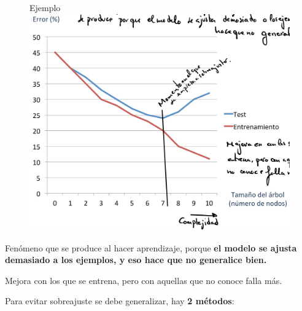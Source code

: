 \documentclass[12pt, twoside, openright]{report} %
\begin{document}
\begin{figure}[H]
	Ejemplo
	{\includegraphics[scale=.2]{image-20210305195646416.png}}
\end{figure}

Fenómeno que se produce al hacer aprendizaje, porque \textbf{el modelo
se ajusta demasiado a los ejemplos, y eso hace que no generalice bien.}

Mejora con los que se entrena, pero con aquellas que no conoce falla
más.

Para evitar sobreajuste se debe generalizar, hay \textbf{2 métodos}:
\end{document}
